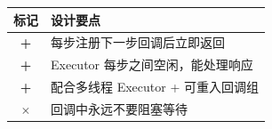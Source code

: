 \documentclass[landscape,11pt]{article}
\begin{document}
\begin{minipage}[t]{0.49\textwidth}
\vspace{6pt}

\begin{center}
\begin{tabular}{cl}
\toprule
\textbf{标记} & \textbf{设计要点} \\
\midrule
\textcolor{wingreen}{\textbf{+}} & 每步注册下一步回调后立即返回 \\
\textcolor{wingreen}{\textbf{+}} & Executor 每步之间空闲，能处理响应 \\
\textcolor{wingreen}{\textbf{+}} & 配合多线程 Executor + 可重入回调组 \\
\textcolor{accent}{\textbf{$\times$}} & 回调中永远不要阻塞等待 \\
\bottomrule
\end{tabular}
\end{center}

\end{minipage}
\end{document}
